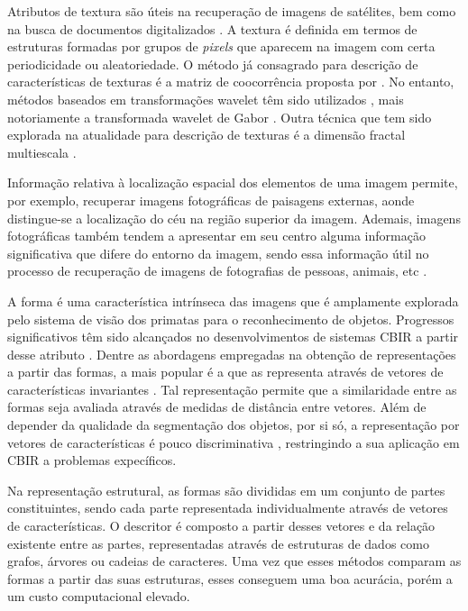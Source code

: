 Atributos de textura são úteis na recuperação de imagens de satélites, bem como na busca de documentos digitalizados \cite{Smeulders:2000}. A textura é definida em termos de estruturas formadas por grupos de \textit{pixels} que aparecem na imagem com certa periodicidade ou aleatoriedade. O método já consagrado para descrição de características de texturas é a matriz de coocorrência proposta por . No entanto, métodos baseados em transformações wavelet têm sido utilizados \cite{5376587}, mais notoriamente a transformada wavelet de Gabor \cite{531803}. Outra técnica que tem sido explorada na atualidade para descrição de texturas é a dimensão fractal multiescala \cite{Florindo:2013}. 

Informação relativa à localização espacial dos elementos de uma imagem permite, por exemplo, recuperar imagens fotográficas de paisagens externas, aonde distingue-se a localização do céu na região superior da imagem. Ademais, imagens fotográficas também tendem a apresentar em seu centro alguma informação significativa que difere do entorno da imagem, sendo essa informação útil no processo de recuperação de imagens de fotografias de pessoas, animais, etc \cite{Liu:2007}.

A forma é uma característica intrínseca das imagens que é amplamente explorada pelo sistema de visão dos primatas para o reconhecimento de objetos. Progressos significativos têm sido alcançados no desenvolvimentos de sistemas \ac{CBIR} a partir desse atributo \cite{Liu:2007,Smeulders:2000}. Dentre as abordagens empregadas na obtenção de representações a partir das formas, a mais popular é a que as representa através de vetores de características invariantes \cite{Ullman:1996}. Tal representação permite que a similaridade entre as formas seja avaliada através de medidas de distância entre vetores. Além de depender da qualidade da segmentação dos objetos, por si só, a representação por vetores de características é pouco discriminativa \cite{Ullman:1996}, restringindo a sua aplicação em \ac{CBIR} a problemas expecíficos.

Na representação estrutural, as formas são divididas em um conjunto de partes constituintes, sendo cada parte representada individualmente através de vetores de características. O descritor é composto a partir desses vetores e da relação existente entre as partes, representadas através de estruturas de dados como grafos, árvores ou cadeias de caracteres. Uma vez que esses métodos comparam as formas a partir das suas estruturas, esses conseguem uma boa acurácia, porém a um custo computacional elevado.



